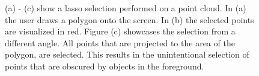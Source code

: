 \begin{figure}
\centering
{}\par\medskip
{}\par\medskip        
{}
	
\caption{(a) - (c) show a lasso selection performed on a point cloud. In (a) the user draws a polygon onto the screen. In (b) the selected points are visualized in red. Figure (c) showcases the selection from a different angle. All points that are projected to the area of the polygon, are selected. This results in the unintentional selection of points that are obscured by objects in the foreground.}
\label{fig:lasso}
\end{figure}


